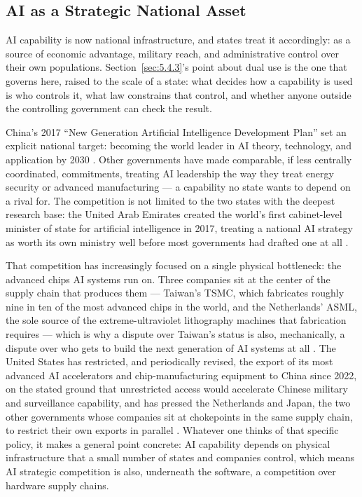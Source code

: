 \subsection{AI as a Strategic National Asset}
\label{sec:8.7.6}
AI capability is now national infrastructure, and states treat it accordingly: as a source of economic advantage, military reach, and administrative control over their own populations. Section~\ref{sec:5.4.3}'s point about dual use is the one that governs here, raised to the scale of a state: what decides how a capability is used is who controls it, what law constrains that control, and whether anyone outside the controlling government can check the result.

China's 2017 “New Generation Artificial Intelligence Development Plan” set an explicit national target: becoming the world leader in AI theory, technology, and application by 2030 \autocite{chinastatecouncil2017newgeneration} \autocite{chinastatecouncil2017newgenerationb}. Other governments have made comparable, if less centrally coordinated, commitments, treating AI leadership the way they treat energy security or advanced manufacturing — a capability no state wants to depend on a rival for. The competition is not limited to the two states with the deepest research base: the United Arab Emirates created the world's first cabinet-level minister of state for artificial intelligence in 2017, treating a national AI strategy as worth its own ministry well before most governments had drafted one at all \autocite{uae2017alolama}.

That competition has increasingly focused on a single physical bottleneck: the advanced chips AI systems run on. Three companies sit at the center of the supply chain that produces them — Taiwan's TSMC, which fabricates roughly nine in ten of the most advanced chips in the world, and the Netherlands' ASML, the sole source of the extreme-ultraviolet lithography machines that fabrication requires — which is why a dispute over Taiwan's status is also, mechanically, a dispute over who gets to build the next generation of AI systems at all \autocite{miller2022chipwar}. The United States has restricted, and periodically revised, the export of its most advanced AI accelerators and chip-manufacturing equipment to China since 2022, on the stated ground that unrestricted access would accelerate Chinese military and surveillance capability, and has pressed the Netherlands and Japan, the two other governments whose companies sit at chokepoints in the same supply chain, to restrict their own exports in parallel \autocite{bis2022implementation}. Whatever one thinks of that specific policy, it makes a general point concrete: AI capability depends on physical infrastructure that a small number of states and companies control, which means AI strategic competition is also, underneath the software, a competition over hardware supply chains.

